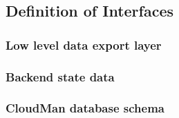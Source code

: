 \documentclass[12pt]{article}
\begin{document}
%

%
%


\subsection{Definition of Interfaces}

\subsubsection{Low level data export layer}


\subsubsection{Backend state data}


\subsubsection{CloudMan database schema}



%
%
\begin{thebibliography}{99}

\end{thebibliography}
\end{document}

